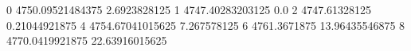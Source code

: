 0 4750.09521484375 2.6923828125
1 4747.40283203125 0.0
2 4747.61328125 0.21044921875
4 4754.67041015625 7.267578125
6 4761.3671875 13.96435546875
8 4770.0419921875 22.63916015625

